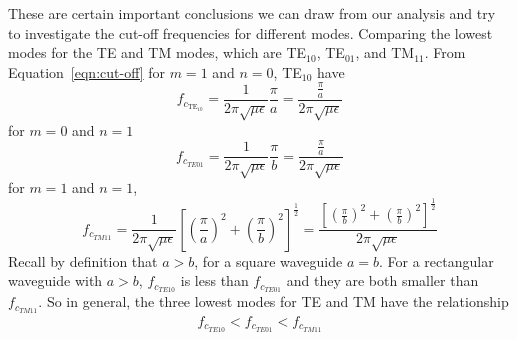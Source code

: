 These are certain important conclusions we can draw from our analysis and try to investigate the cut-off frequencies for different modes. Comparing the lowest modes for the TE and TM modes, which are TE$_{10}$, TE$_{01}$, and TM$_{11}$.
From Equation~\ref{eqn:cut-off} for  $m=1$ and $n=0$, TE$_{10}$ have 
\begin{dmath*}
f_{c_{\text{TE}_{10}}} = \frac{1}{2\pi \sqrt{\mu\epsilon}}\frac{\pi}{a} = \frac{\frac{\pi}{a}}{2\pi \sqrt{\mu\epsilon}}
\end{dmath*}
for $m=0$ and $n=1$
\begin{dmath*}
f_{c_{TE{01}}} = \frac{1}{2\pi \sqrt{\mu\epsilon}}\frac{\pi}{b} = \frac{\frac{\pi}{a}}{2\pi \sqrt{\mu\epsilon}}
\end{dmath*}
for $m=1$ and $n=1$, 
\begin{dmath*} 
f_{c_{TM{11}}} = \frac{1}{2\pi \sqrt{\mu\epsilon}}\left[\left(\frac{\pi}{a}\right)^2 + \left(\dfrac{\pi}{b}\right)^2\right]^{\frac{1}{2}} = \frac{\left[\left(\frac{\pi}{b}\right)^2 + \left(\frac{\pi}{b}\right)^2\right]^{\frac{1}{2}}}{2\pi \sqrt{\mu\epsilon}}
\end{dmath*}
Recall by definition that $a>b$, for a square waveguide $a=b$. For a rectangular waveguide with $a>b$, $f_{c_{TE{10}}}$ is less than $f_{c_{TE{01}}}$ and they are both smaller than $f_{c_{TM{11}}}$. So in general, the three lowest modes for TE and TM have the relationship 
\begin{align*}
f_{c_{TE{10}}}<f_{c_{TE{01}}}<f_{c_{TM{11}}}
\end{align*}
